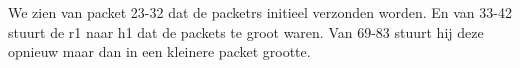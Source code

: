 We zien van packet 23-32 dat de packetrs initieel verzonden worden. 
En van 33-42 stuurt de r1 naar h1 dat de packets te groot waren.
Van 69-83 stuurt hij deze opnieuw maar dan in een kleinere packet grootte.
